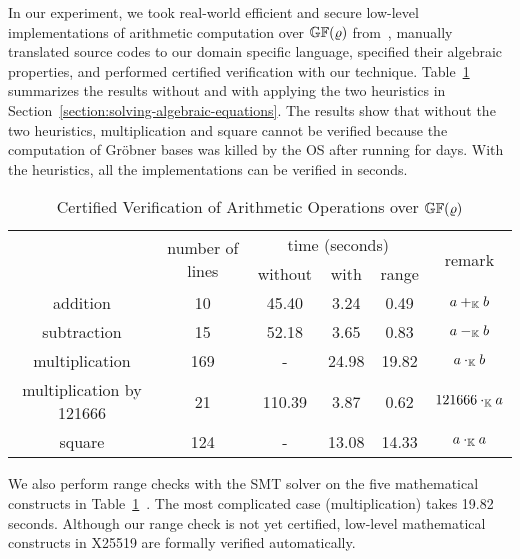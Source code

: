
In our experiment, we took real-world efficient and secure
low-level implementations of arithmetic computation over
$\mathbb{GF}(\varrho)$ from~\cite{BDL+:11:HSHSS,BDL+:12:HSHSS}, 
manually translated source
codes to our domain specific language, specified their algebraic
properties, and performed certified verification with our technique. 
Table~\ref{table:arithmetic-operations} summarizes the results
without and with applying the two heuristics in Section~\ref{section:solving-algebraic-equations}.
The results show that without the two heuristics, multiplication and square
cannot be verified because the computation of Gr\"obner bases was killed by the OS
after running for days.
With the heuristics, all the implementations can be verified in seconds.



\vspace{-1em}
\begin{table}[ht]
  \caption{Certified Verification of Arithmetic Operations over
    $\mathbb{GF}(\varrho)$}
  \centering
  \begin{tabular}{|c|c|c|c|c|c|}
    \hline
    \multirow{2}{*}{} & \multirow{2}{*}{number of lines} & \multicolumn{3}{|c|}{time (seconds)} & \multirow{2}{*}{remark} \\ \cline{3-5}
    & & without & with & range & \\
    \hline
    addition                 & 10  & 45.40  & 3.24   & 0.49   & $a +_{\mathbb{K}} b$ \\
    \hline
    subtraction              & 15  & 52.18  & 3.65   & 0.83   & $a -_{\mathbb{K}} b$ \\
    \hline
    multiplication           & 169 & -      & 24.98  & 19.82 & $a \cdot_{\mathbb{K}} b$\\
    \hline
    multiplication by 121666 & 21  & 110.39 & 3.87   & 0.62   & $121666 \cdot_{\mathbb{K}} a$\\
    \hline
    square                   & 124 & -      & 13.08  & 14.33 & $a \cdot_{\mathbb{K}} a$\\
    \hline
  \end{tabular}
  \label{table:arithmetic-operations}
\end{table}
\vspace{-1em}


We also perform range checks with the SMT solver \boolector on the
five mathematical constructs in 
Table~\ref{table:arithmetic-operations}~\cite{boolector}. The most complicated case
(multiplication) takes 19.82 seconds.
Although our range check is not yet certified, low-level
mathematical constructs in X25519 are formally verified automatically.


